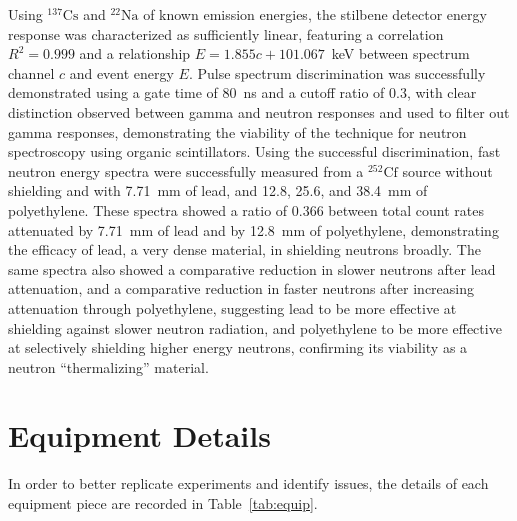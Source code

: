 \documentclass[12pt]{article}
\newcommand{\CsSrc}{$\mathrm{^{137}Cs}$\xspace}
\newcommand{\NaSrc}{$\mathrm{^{22}Na}$\xspace}
\newcommand{\CfSrc}{$\mathrm{^{252}Cf}$\xspace}
\begin{document}
Using \CsSrc and \NaSrc of known emission energies, the stilbene detector energy response was characterized as sufficiently linear, featuring a correlation $R^2=0.999$ and a relationship $E=1.855c + 101.067$~keV between spectrum channel $c$ and event energy $E$.
Pulse spectrum discrimination was successfully demonstrated using a gate time of 80~ns and a cutoff ratio of 0.3, with clear distinction observed between gamma and neutron responses and used to filter out gamma responses, demonstrating the viability of the technique for neutron spectroscopy using organic scintillators.
Using the successful discrimination, fast neutron energy spectra were successfully measured from a \CfSrc source without shielding and with 7.71~mm of lead, and 12.8, 25.6, and 38.4~mm of polyethylene.
These spectra showed a ratio of 0.366 between total count rates attenuated by 7.71~mm of lead and by 12.8~mm of polyethylene, demonstrating the efficacy of lead, a very dense material, in shielding neutrons broadly.
The same spectra also showed a comparative reduction in slower neutrons after lead attenuation, and a comparative reduction in faster neutrons after increasing attenuation through polyethylene, suggesting lead to be more effective at shielding against slower neutron radiation, and polyethylene to be more effective at selectively shielding higher energy neutrons, confirming its viability as a neutron ``thermalizing'' material.\\

% 
\pagebreak\printbibliography

\appendix
\pagebreak
\FloatBarrier\section{Equipment Details}\label{app:equip}
In order to better replicate experiments and identify issues, the details of each equipment piece are recorded in Table~\ref{tab:equip}.
\end{document}
